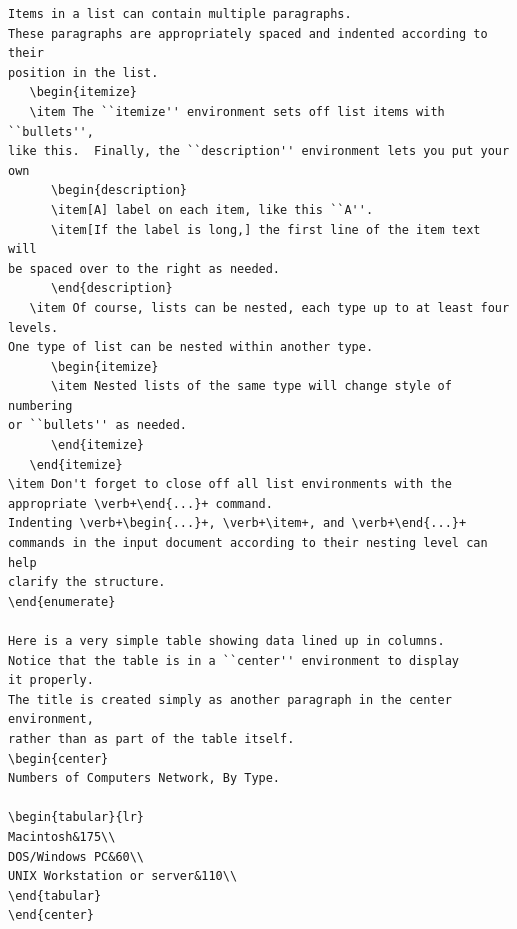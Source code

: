 \documentclass[11pt,oneside]{book}
\begin{document}
\begin{verbatim}
Items in a list can contain multiple paragraphs.
These paragraphs are appropriately spaced and indented according to their
position in the list.
   \begin{itemize}
   \item The ``itemize'' environment sets off list items with ``bullets'',
like this.  Finally, the ``description'' environment lets you put your own
      \begin{description}
      \item[A] label on each item, like this ``A''.
      \item[If the label is long,] the first line of the item text will
be spaced over to the right as needed.
      \end{description}
   \item Of course, lists can be nested, each type up to at least four levels.
One type of list can be nested within another type.
      \begin{itemize}
      \item Nested lists of the same type will change style of numbering 
or ``bullets'' as needed.
      \end{itemize}
   \end{itemize}
\item Don't forget to close off all list environments with the 
appropriate \verb+\end{...}+ command.
Indenting \verb+\begin{...}+, \verb+\item+, and \verb+\end{...}+
commands in the input document according to their nesting level can help 
clarify the structure.
\end{enumerate}

Here is a very simple table showing data lined up in columns.
Notice that the table is in a ``center'' environment to display
it properly.
The title is created simply as another paragraph in the center environment,
rather than as part of the table itself.
\begin{center}
Numbers of Computers Network, By Type.

\begin{tabular}{lr}
Macintosh&175\\
DOS/Windows PC&60\\
UNIX Workstation or server&110\\
\end{tabular}
\end{center}


\end{verbatim}
\end{document}
